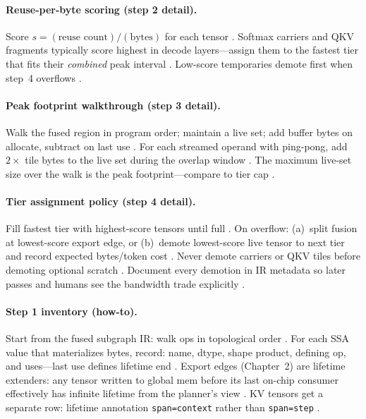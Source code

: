 \paragraph{Reuse-per-byte scoring (step 2 detail).}
Score $s = (\text{reuse count}) / (\text{bytes})$ for each tensor \citep{dlbook,dao2022flashattention}.
Softmax carriers and QKV fragments typically score highest in decode layers---assign them to the fastest tier that fits their \emph{combined} peak interval \citep{dao2022flashattention,patel2025llminference}.
Low-score temporaries demote first when step~4 overflows \citep{yirage2026,wu2024mirage}.

\paragraph{Peak footprint walkthrough (step 3 detail).}
Walk the fused region in program order; maintain a live set; add buffer bytes on allocate, subtract on last use \citep{rotem2018glow,yirage2026}.
For each streamed operand with ping-pong, add $2 \times$ tile bytes to the live set during the overlap window \citep{semianalysis2024tma,dao2022flashattention}.
The maximum live-set size over the walk is the peak footprint---compare to tier cap \citep{nvidia2022hopper,amd2024aie}.

\paragraph{Tier assignment policy (step 4 detail).}
Fill fastest tier with highest-score tensors until full \citep{dlbook}.
On overflow: (a)~split fusion at lowest-score export edge, or (b)~demote lowest-score live tensor to next tier and record expected bytes/token cost \citep{chen2020compilerbasedhardw,yirage2026,memoryfloor2026}.
Never demote carriers or QKV tiles before demoting optional scratch \citep{dao2022flashattention,patel2025llminference}.
Document every demotion in IR metadata so later passes and humans see the bandwidth trade explicitly \citep{yirage2026,wu2024mirage}.

\paragraph{Step 1 inventory (how-to).}
Start from the fused subgraph IR: walk ops in topological order \citep{rotem2018glow,chen2020compilerbasedhardw}.
For each SSA value that materializes bytes, record: name, dtype, shape product, defining op, and uses---last use defines lifetime end \citep{dlbook,yirage2026}.
Export edges (Chapter~2) are lifetime extenders: any tensor written to global mem before its last on-chip consumer effectively has infinite lifetime from the planner's view \citep{taxbreak2026,memoryfloor2026}.
KV tensors get a separate row: lifetime annotation \texttt{span=context} rather than \texttt{span=step} \citep{kwon2023vllm,dao2023flashdecoding}.

